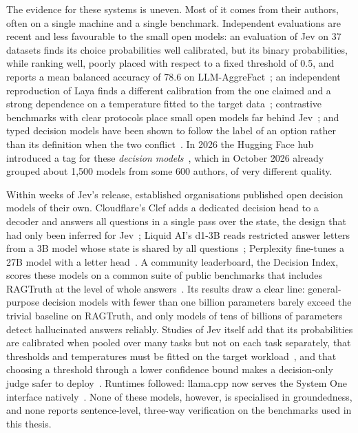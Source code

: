 The evidence for these systems is uneven. Most of it comes from their authors, often on a single machine and a single
benchmark. Independent evaluations are recent and less favourable to the small open models: an evaluation of Jev on 37
datasets finds its choice probabilities well calibrated, but its binary probabilities, while ranking well, poorly placed
with respect to a fixed threshold of 0.5, and reports a mean balanced accuracy of 78.6 on LLM-AggreFact~\cite{deusser2026jev}; an independent reproduction of Laya finds a different calibration from the one claimed
and a strong dependence on a temperature fitted to the target data~\cite{nandakishore2026laya}; contrastive benchmarks
with clear protocols place small open models far behind Jev~\cite{yong2026decidebench}; and typed decision models have
been shown to follow the label of an option rather than its definition when the two conflict~\cite{azizi2026labels}. In
2026 the Hugging Face hub introduced a tag for these \emph{decision models}~\cite{hf2026decisionmodels}, which in
October 2026 already grouped about 1{,}500 models from some 600 authors, of very different quality.

Within weeks of Jev's release, established organisations published open decision models of their own. Cloudflare's Clef
adds a dedicated decision head to a decoder and answers all questions in a single pass over the state, the design that had
only been inferred for Jev~\cite{cloudflare2026clef}; Liquid AI's d1-3B reads restricted answer letters from a 3B model
whose state is shared by all questions~\cite{liquid2026d1}; Perplexity fine-tunes a 27B model with a letter
head~\cite{perplexity2026decider}. A community leaderboard, the Decision Index, scores these models on a common suite of
public benchmarks that includes RAGTruth at the level of whole answers~\cite{decisionindex2026}. Its results draw a clear
line: general-purpose decision models with fewer than one billion parameters barely exceed the trivial baseline on
RAGTruth, and only models of tens of billions of parameters detect hallucinated answers reliably. Studies of Jev itself
add that its probabilities are calibrated when pooled over many tasks but not on each task separately, that thresholds
and temperatures must be fitted on the target workload~\cite{guo2026justaskjev,li2026jevjudge}, and that choosing a
threshold through a lower confidence bound makes a decision-only judge safer to deploy~\cite{li2026jevjudge}. Runtimes
followed: llama.cpp now serves the System One interface natively~\cite{llamacpp}. None of these models, however, is
specialised in groundedness, and none reports sentence-level, three-way verification on the benchmarks used in this
thesis.

